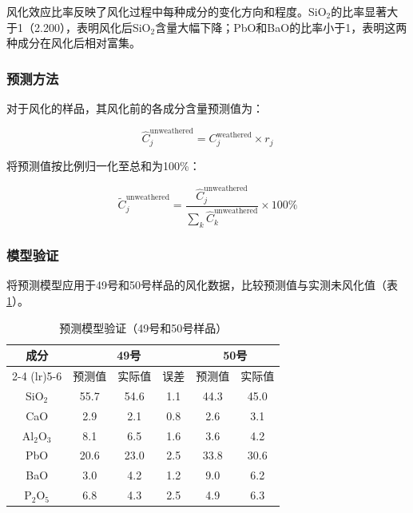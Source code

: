 \documentclass[12pt,a4paper]{ctexart}
\begin{document}
风化效应比率反映了风化过程中每种成分的变化方向和程度。SiO$_2$的比率显著大于1（2.200），表明风化后SiO$_2$含量大幅下降；PbO和BaO的比率小于1，表明这两种成分在风化后相对富集。

\subsubsection{预测方法}

对于风化的样品，其风化前的各成分含量预测值为：

\begin{equation}
\hat{C}_j^{\text{unweathered}} = C_j^{\text{weathered}} \times r_j
\end{equation}

将预测值按比例归一化至总和为100\%：

\begin{equation}
\tilde{C}_j^{\text{unweathered}} = \frac{\hat{C}_j^{\text{unweathered}}}{\sum_k \hat{C}_k^{\text{unweathered}}} \times 100\%
\end{equation}

\subsubsection{模型验证}

将预测模型应用于49号和50号样品的风化数据，比较预测值与实测未风化值（表\ref{tab:pred_validation}）。

\begin{table}[H]
\centering
\caption{预测模型验证（49号和50号样品）}
\label{tab:pred_validation}
\begin{tabular}{cccccc}
\toprule
\multirow{2}{*}{\textbf{成分}} & \multicolumn{3}{c}{\textbf{49号}} & \multicolumn{2}{c}{\textbf{50号}} \\
\cmidrule(lr){2-4} \cmidrule(lr){5-6}
& 预测值 & 实际值 & 误差 & 预测值 & 实际值 \\
\midrule
SiO$_2$ & 55.7 & 54.6 & 1.1 & 44.3 & 45.0 \\
CaO     & 2.9  & 2.1  & 0.8 & 2.6  & 3.1  \\
Al$_2$O$_3$ & 8.1  & 6.5  & 1.6 & 3.6  & 4.2  \\
PbO     & 20.6 & 23.0 & 2.5 & 33.8 & 30.6 \\
BaO     & 3.0  & 4.2  & 1.2 & 9.0  & 6.2  \\
P$_2$O$_5$ & 6.8  & 4.3  & 2.5 & 4.9  & 6.3  \\
\bottomrule
\end{tabular}
\end{table}
\end{document}
